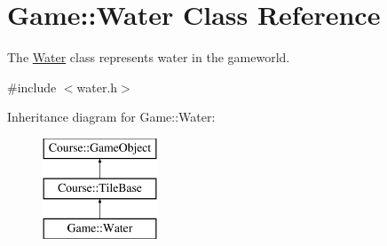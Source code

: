 \hypertarget{classGame_1_1Water}{\section{Game\-:\-:Water Class Reference}
\label{classGame_1_1Water}
}


The \hyperlink{classGame_1_1Water}{Water} class represents water in the gameworld.  




{\ttfamily \#include $<$water.\-h$>$}

Inheritance diagram for Game\-:\-:Water\-:\begin{figure}[H]
\begin{center}
\leavevmode
\includegraphics[height=3.000000cm]{classGame_1_1Water}
\end{center}
\end{figure}
